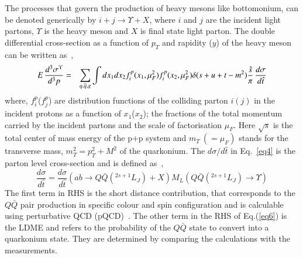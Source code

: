 
The processes that govern the production of heavy mesons like bottomonium,
can be denoted generically by 
$i+j\rightarrow \Upsilon +X$, where $i$ and $j$ are the incident light partons,
$\Upsilon$ is the heavy meson and $X$ is final state light parton.
The double differential cross-section as a function of $p_T$ and rapidity ($y$) of 
the heavy meson can be written as~\cite{Kumar:2016ojy},
\begin{eqnarray}
  E\,\frac{d^3\sigma^{\Upsilon} }{d^3p} &=& \sum_{q,\overline{q},g} \int dx_1 dx_2 f_{i}^p(x_1,\mu_F^2)
  f_{i}^p(x_2,\mu_F^2) \delta(s+u+t-m^2) {\hat{s} \over \pi} \, \frac{d\sigma}{d\hat{t}}
  \label{eq4}
\end{eqnarray}
where, $f_{i}^p$($f_{j}^p$) are distribution functions of the colliding parton $i(j)$ in
the incident protons as a function of $x_1$($x_2$); the fractions of the total momentum
carried by the incident partons and the scale of factorisation $\mu_F$.
Here $\sqrt{s}$ is the total center of mass energy of the p+p system and $m_T~(=\mu_F)$ stands for
the transverse mass, $m_T^2=p_T^2 + M^2$ of the quarkonium.
The ${d\sigma}/{d\hat{t}}$ in Eq.~\ref{eq4} is the parton level cross-section and is
defined as~\cite{Bodwin:1994jh},
\begin{equation}
  \frac{d\sigma}{d\hat{t}} = \frac{d\sigma}{d\hat{t}}(ab\rightarrow Q\bar{Q}(^{2s+1}L_J)+X)
  M_L(Q\bar{Q}(^{2s+1}L_J)\rightarrow \Upsilon)
  \label{eq6}
\end{equation}
The first term in RHS is the short distance contribution, that corresponds to the $Q\bar{Q}$
pair production in specific colour and spin configuration and is calculable using 
perturbative QCD (pQCD)~\cite{Braaten:2000cm,Baier:1983va,Humpert:1986cy,Gastmans:1987be,Cho:1995vh,Cho:1995ce}.
The other term in the RHS of Eq.(\ref{eq6}) is the LDME 
and refers to the probability of the $Q\bar{Q}$ state to convert into a quarkonium state.
They are determined by comparing the calculations with the measurements.






